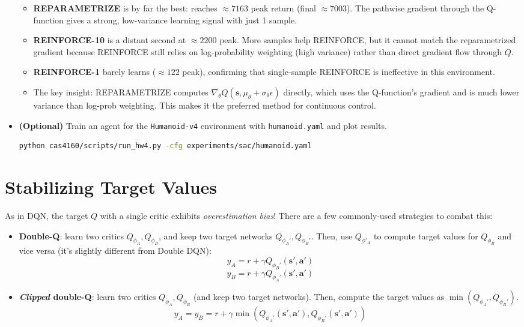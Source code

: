 \documentclass{article}
\def\rva{{\mathbf{a}}}
\def\rvs{{\mathbf{s}}}
\begin{document}
\begin{itemize}
    \begin{itemize}
        \item \textbf{REPARAMETRIZE} is by far the best: reaches $\approx 7163$ peak return (final $\approx 7003$). The pathwise gradient through the Q-function gives a strong, low-variance learning signal with just 1 sample.
        \item \textbf{REINFORCE-10} is a distant second at $\approx 2200$ peak. More samples help REINFORCE, but it cannot match the reparametrized gradient because REINFORCE still relies on log-probability weighting (high variance) rather than direct gradient flow through $Q$.
        \item \textbf{REINFORCE-1} barely learns ($\approx 122$ peak), confirming that single-sample REINFORCE is ineffective in this environment.
        \item The key insight: REPARAMETRIZE computes $\nabla_\theta Q(\rvs, \mu_\theta + \sigma_\theta\epsilon)$ directly, which uses the Q-function's gradient and is much lower variance than log-prob weighting. This makes it the preferred method for continuous control.
    \end{itemize}
    
    \item \textbf{(Optional)} Train an agent for the \verb|Humanoid-v4| environment with \verb|humanoid.yaml| and plot results.
\begin{lstlisting}[language=bash,breaklines=true]
  python cas4160/scripts/run_hw4.py -cfg experiments/sac/humanoid.yaml
\end{lstlisting}
\end{itemize}



\section{Stabilizing Target Values}

As in DQN, the target $Q$ with a single critic exhibits \textit{overestimation bias}! There are a few commonly-used strategies to combat this:
\begin{itemize}
    \item \textbf{Double-Q}: learn two critics $Q_{\phi_A}, Q_{\phi_B}$, and keep two target networks $Q_{\phi_A'}, Q_{\phi_B'}$. Then, use $Q_{\phi'_A}$ to compute target values for $Q_{\phi_B}$ and vice versa (it's slightly different from Double DQN):
    \[y_A = r + \gamma Q_{\phi_B'}(\rvs', \rva')\]
    \[y_B = r + \gamma Q_{\phi_A'}(\rvs', \rva')\]
    
    \item \textbf{\textit{Clipped} double-Q}: learn two critics $Q_{\phi_A}, Q_{\phi_B}$ (and keep two target networks). Then, compute the target values as $\min(Q_{\phi_A'}, Q_{\phi_B'})$.
    \[y_A = y_B = r + \gamma \min\left(Q_{\phi_A'}(\rvs', \rva'), Q_{\phi_B'}(\rvs', \rva')\right)\]
\end{itemize}
\end{document}
